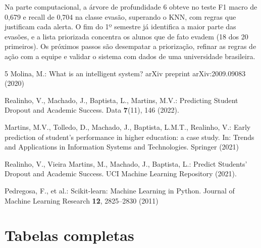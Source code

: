 \documentclass[runningheads]{llncs}
\begin{document}
Na parte computacional, a árvore de profundidade 6 obteve no teste F1 macro de 0,679 e
recall de 0,704 na classe evasão, superando o KNN, com regras que justificam cada
alerta. O fim do 1º semestre já identifica a maior parte das evasões, e a lista
priorizada concentra os alunos que de fato evadem (18 dos 20 primeiros). Os próximos
passos são desempatar a priorização, refinar as regras de ação com a equipe e validar o
sistema com dados de uma universidade brasileira.

%
\begin{thebibliography}{5}
Molina, M.: What is an intelligent system? arXiv preprint arXiv:2009.09083 (2020)

Realinho, V., Machado, J., Baptista, L., Martins, M.V.: Predicting Student Dropout and
Academic Success. Data \textbf{7}(11), 146 (2022). 

Martins, M.V., Tolledo, D., Machado, J., Baptista, L.M.T., Realinho, V.: Early
prediction of student's performance in higher education: a case study. In: Trends and
Applications in Information Systems and Technologies. Springer (2021)

Realinho, V., Vieira Martins, M., Machado, J., Baptista, L.: Predict Students' Dropout
and Academic Success. UCI Machine Learning Repository (2021). 

Pedregosa, F., et al.: Scikit-learn: Machine Learning in Python. Journal of Machine
Learning Research \textbf{12}, 2825--2830 (2011)
\end{thebibliography}
%
\clearpage %
\appendix
\section{Tabelas completas}\label{ap:tabelas}
\end{document}
